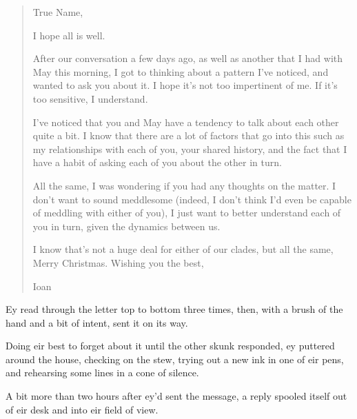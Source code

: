 \begin{quote}
True Name,

I hope all is well.

After our conversation a few days ago, as well as another that I had with May this morning, I got to thinking about a pattern I've noticed, and wanted to ask you about it. I hope it's not too impertinent of me. If it's too sensitive, I understand.

I've noticed that you and May have a tendency to talk about each other quite a bit. I know that there are a lot of factors that go into this such as my relationships with each of you, your shared history, and the fact that I have a habit of asking each of you about the other in turn.

All the same, I was wondering if you had any thoughts on the matter. I don't want to sound meddlesome (indeed, I don't think I'd even be capable of meddling with either of you), I just want to better understand each of you in turn, given the dynamics between us.

I know that's not a huge deal for either of our clades, but all the same, Merry Christmas. Wishing you the best,

Ioan
\end{quote}

Ey read through the letter top to bottom three times, then, with a brush of the hand and a bit of intent, sent it on its way.

Doing eir best to forget about it until the other skunk responded, ey puttered around the house, checking on the stew, trying out a new ink in one of eir pens, and rehearsing some lines in a cone of silence.

A bit more than two hours after ey'd sent the message, a reply spooled itself out of eir desk and into eir field of view.

